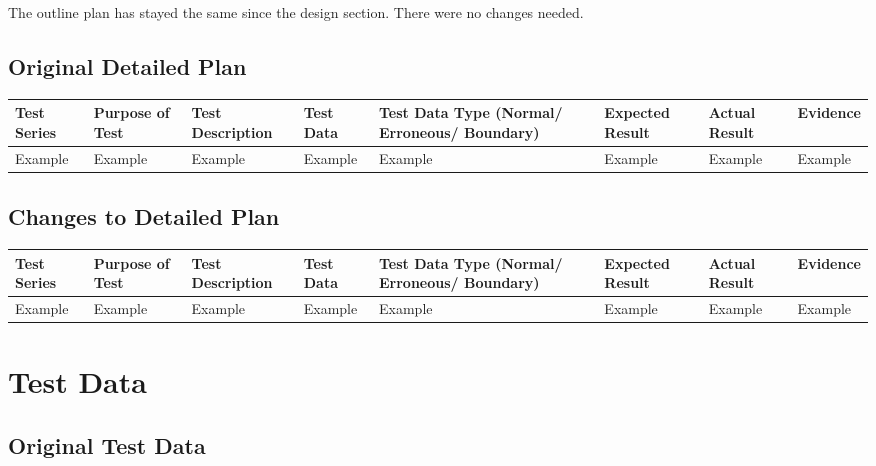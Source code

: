 \begin{landscape}
\begin{center}
\begin{tabular}{|p{2cm}|p{5cm}|p{5cm}|p{4cm}|}
    \end{tabular}
\end{center}

The outline plan has stayed the same since the design section. There were no changes needed.


\subsection{Original Detailed Plan}

\begin{center}
    \begin{longtable}{|p{1.5cm}|p{2.5cm}|p{2.5cm}|p{2cm}|p{2cm}|p{2cm}|p{2cm}|p{2cm}|}
        \hline
        \textbf{Test Series} & \textbf{Purpose of Test} & \textbf{Test Description} & \textbf{Test Data} & \textbf{Test Data Type (Normal/ Erroneous/ Boundary)} & \textbf{Expected Result} & \textbf{Actual Result} & \textbf{Evidence}\\ \hline
        Example & Example & Example & Example & Example & Example & Example & Example \\ \hline
    \end{longtable}
\end{center}

\subsection{Changes to Detailed Plan}

\begin{center}
    \begin{longtable}{|p{1.5cm}|p{2.5cm}|p{2.5cm}|p{2cm}|p{2cm}|p{2cm}|p{2cm}|p{2cm}|}
        \hline
        \textbf{Test Series} & \textbf{Purpose of Test} & \textbf{Test Description} & \textbf{Test Data} & \textbf{Test Data Type (Normal/ Erroneous/ Boundary)} & \textbf{Expected Result} & \textbf{Actual Result} & \textbf{Evidence}\\ \hline
        Example & Example & Example & Example & Example & Example & Example & Example \\ \hline
    \end{longtable}
\end{center}

\section{Test Data}

\subsection{Original Test Data}


\end{landscape}
